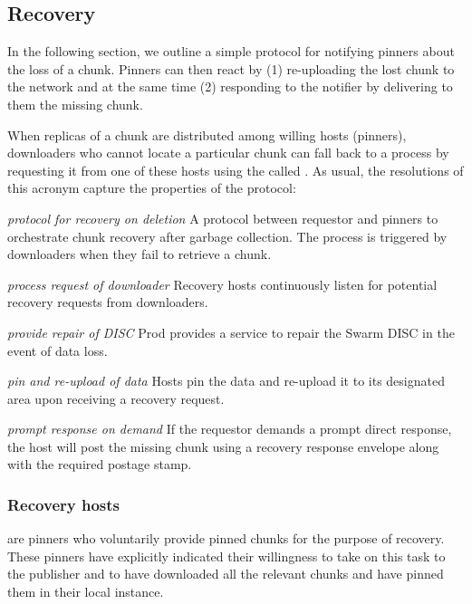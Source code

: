 \subsection{Recovery \statusyellow}\label{sec:recovery-chunks}


In the following section, we outline a simple protocol for notifying pinners about the loss of a chunk. Pinners can then react by (1) re-uploading the lost chunk to the network and at the same time (2) responding to the notifier by delivering to them the missing chunk. 

When replicas of a chunk are distributed among willing hosts (pinners), downloaders who cannot locate a particular chunk can fall back to a  process by requesting it from one of these hosts using the  called .
As usual, the resolutions of this acronym capture the properties of the protocol:

\begin{labelledlist}
\item[\emph{protocol for recovery on deletion}] A protocol between requestor and pinners to orchestrate chunk recovery after garbage collection. The process is triggered by downloaders when they fail to retrieve a chunk.
\item[\emph{process request of downloader}] Recovery hosts continuously listen for potential recovery requests from downloaders.
\item[\emph{provide repair of DISC}] 
Prod provides a service to repair the Swarm DISC in the event of data loss.
\item[\emph{pin and re-upload of data}]    
Hosts pin the data and re-upload it to its designated area upon receiving a recovery request. 
\item[\emph{prompt response on demand}] If the requestor demands a prompt direct response, the host will post the missing chunk using a recovery response envelope along with the required postage stamp.
\end{labelledlist}

\subsubsection{Recovery hosts}

 are pinners who voluntarily provide pinned chunks for the purpose of recovery. These pinners have explicitly indicated their willingness to take on this task to the publisher and to have downloaded all the relevant chunks and have pinned them in their local instance. 

